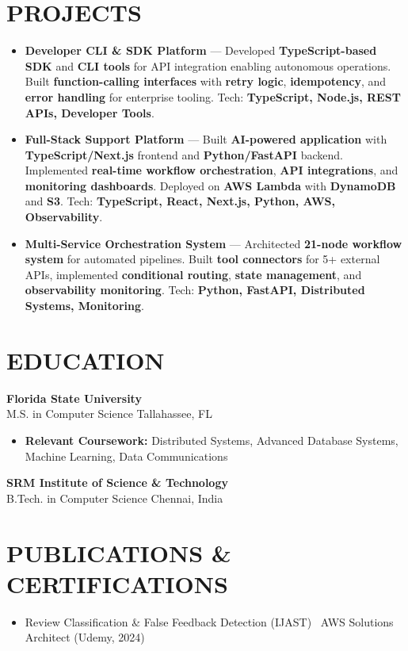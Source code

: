 \documentclass[letterpaper,10pt]{article}
\newcommand{\resumeItem}[1]{\item\small #1}
\newcommand{\resumeSubheading}[4]{
  \vspace{6pt}
  \noindent
  \textbf{#1} \hfill {\footnotesize #2} \\
  [-1pt]
  \noindent
  \small #3 \hfill {\small #4}
  \vspace{3pt}
}
\newcommand{\resumeItemsStart}{\vspace{-2pt}\begin{itemize}}
\newcommand{\resumeItemsEnd}{\end{itemize}\vspace{6pt}}
\begin{document}
\section{\textcolor{metablue}{PROJECTS}}
\vspace{-8pt}
\begin{tcolorbox}[colback=white,colframe=metablue,boxrule=0.8pt,arc=2pt,left=4pt,right=4pt,top=2pt,bottom=2pt,before skip=0pt]
\begin{itemize}
\resumeItem{\textbf{Developer CLI \& SDK Platform} --- Developed \textbf{TypeScript-based SDK} and \textbf{CLI tools} for API integration enabling autonomous operations. Built \textbf{function-calling interfaces} with \textbf{retry logic}, \textbf{idempotency}, and \textbf{error handling} for enterprise tooling. Tech: \textbf{TypeScript, Node.js, REST APIs, Developer Tools}.}

\resumeItem{\textbf{Full-Stack Support Platform} --- Built \textbf{AI-powered application} with \textbf{TypeScript/Next.js} frontend and \textbf{Python/FastAPI} backend. Implemented \textbf{real-time workflow orchestration}, \textbf{API integrations}, and \textbf{monitoring dashboards}. Deployed on \textbf{AWS Lambda} with \textbf{DynamoDB} and \textbf{S3}. Tech: \textbf{TypeScript, React, Next.js, Python, AWS, Observability}.}

\resumeItem{\textbf{Multi-Service Orchestration System} --- Architected \textbf{21-node workflow system} for automated pipelines. Built \textbf{tool connectors} for 5+ external APIs, implemented \textbf{conditional routing}, \textbf{state management}, and \textbf{observability monitoring}. Tech: \textbf{Python, FastAPI, Distributed Systems, Monitoring}.}

\end{itemize}
\end{tcolorbox}
\vspace{-5pt}


\section{\textcolor{metablue}{EDUCATION}}
\vspace{-10pt}
\resumeSubheading
{Florida State University}{}
{M.S. in Computer Science}{Tallahassee, FL}
\resumeItemsStart
\resumeItem{\textbf{Relevant Coursework:} Distributed Systems, Advanced Database Systems, Machine Learning, Data Communications}
\resumeItemsEnd
\vspace{-5pt}
\resumeSubheading
{SRM Institute of Science \& Technology}{}
{B.Tech. in Computer Science}{Chennai, India}
\vspace{-10pt}

\section{\textcolor{metablue}{PUBLICATIONS \& CERTIFICATIONS}}
\vspace{-5pt}
\begin{itemize}
\resumeItem{Review Classification \& False Feedback Detection (IJAST) \textbar\ AWS Solutions Architect (Udemy, 2024)}
\end{itemize}
\end{document}
